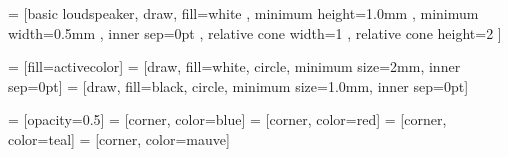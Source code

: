 
 = [basic loudspeaker, draw, fill=white
, minimum height=1.0mm 	    %
, minimum width=0.5mm		    %
, inner sep=0pt
, relative cone width=1	%
, relative cone height=2	    %
]

 = [fill=activecolor]
 = [draw, fill=white, circle, minimum size=2mm, inner sep=0pt]
 = [draw, fill=black, circle, minimum size=1.0mm, inner 
sep=0pt]

 = [opacity=0.5]
 = [corner, color=blue]
 = [corner, color=red]
 = [corner, color=teal]
 = [corner, color=mauve]

